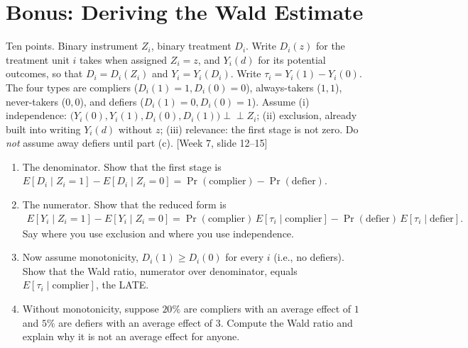 \documentclass[11pt]{article}
\newcommand{\E}{E}
\newcommand{\indep}{\perp\!\!\!\perp}
\newcommand{\slideref}[2]{{\footnotesize\color{gray}[Week #1, slide #2]}}
\begin{document}
\section*{Bonus: Deriving the Wald Estimate}
Ten points. Binary instrument $Z_i$, binary treatment $D_i$. Write $D_i(z)$ for the
treatment unit $i$ takes when assigned $Z_i = z$, and $Y_i(d)$ for its potential outcomes,
so that $D_i = D_i(Z_i)$ and $Y_i = Y_i(D_i)$. Write $\tau_i = Y_i(1) - Y_i(0)$. The four
types are compliers ($D_i(1) = 1, D_i(0) = 0$), always-takers ($1, 1$), never-takers
($0, 0$), and defiers ($D_i(1) = 0, D_i(0) = 1$). Assume
(i) independence: $\big(Y_i(0), Y_i(1), D_i(0), D_i(1)\big) \indep Z_i$;
(ii) exclusion, already built into writing $Y_i(d)$ without $z$;
(iii) relevance: the first stage is not zero.
Do \emph{not} assume away defiers until part (c). \slideref{7}{12--15}

\begin{enumerate}[label=(\alph*),leftmargin=*,itemsep=6pt]
\item The denominator. Show that the first stage is
      $\E[D_i\mid Z_i=1] - \E[D_i\mid Z_i=0] = \Pr(\text{complier}) - \Pr(\text{defier})$.
\item The numerator. Show that the reduced form is
      \begin{align*}
        \E[Y_i\mid Z_i=1] - \E[Y_i\mid Z_i=0]
        = \Pr(\text{complier})\,\E[\tau_i\mid\text{complier}]
        - \Pr(\text{defier})\,\E[\tau_i\mid\text{defier}] .
      \end{align*}
      Say where you use exclusion and where you use independence.
\item Now assume monotonicity, $D_i(1) \ge D_i(0)$ for every $i$ (i.e., no defiers). Show that the Wald ratio,
      numerator over denominator, equals $\E[\tau_i\mid\text{complier}]$, the LATE.
\item Without monotonicity, suppose $20\%$ are compliers with an average effect of $1$ and
      $5\%$ are defiers with an average effect of $3$. Compute the Wald ratio and explain
      why it is not an average effect for anyone.
\end{enumerate}
\end{document}
